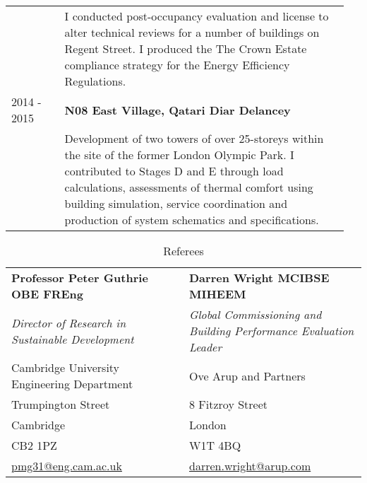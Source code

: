 \documentclass[11pt, oneside]{article}   	%
\begin{document}
\begin{table}[h]
\begin{center}
\begin{tabular}{p{0.15\linewidth} p{0.8\linewidth}}
&I conducted post-occupancy evaluation and license to alter technical reviews for a number of buildings on Regent Street. I produced the The Crown Estate compliance strategy for the Energy Efficiency Regulations. \\
2014 - 2015&\textbf{N08 East Village, Qatari Diar Delancey} \\
&Development of two towers of over 25-storeys within the site of the former London Olympic Park. I contributed to Stages D and E through load calculations, assessments of thermal comfort using building simulation, service coordination and production of system schematics and specifications. \\
\hline
\end{tabular}
\end{center}
\vspace{-10mm}
\end{table}

\begin{table}[h]
\vspace{-5mm}
\caption*{Referees}
\vspace{-5mm}
\small
\begin{center}
\begin{tabular}{p{0.5\linewidth} p{0.5\linewidth}}
\hline
\textbf{Professor Peter Guthrie OBE FREng}&\textbf{Darren Wright MCIBSE MIHEEM} \\
\emph{Director of Research in Sustainable Development}&\emph{Global Commissioning and Building Performance Evaluation Leader}\\
Cambridge University Engineering Department&Ove Arup and Partners\\
Trumpington Street&8 Fitzroy Street\\
Cambridge&London\\
CB2 1PZ&W1T 4BQ\\
\href{mailto:pmg31@eng.cam.ac.uk}{pmg31@eng.cam.ac.uk}&\href{mailto:darren.wright@arup.com}{darren.wright@arup.com}\\
\hline
\end{tabular}
\end{center}
\vspace{-10mm}
\end{table}
\end{document}
